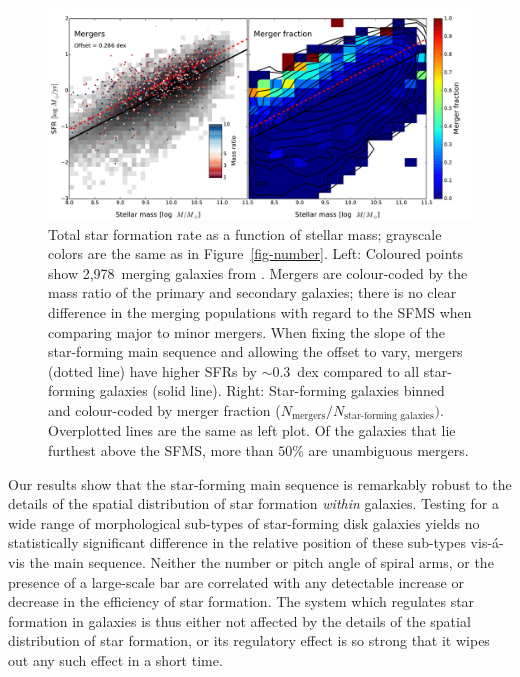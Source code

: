 \documentclass[useAMS,usenatbib]{mn2e}
\begin{document}
\begin{figure}
\includegraphics[angle=0,width=7.0in]{figures/masslim/ms_mergers_both.pdf}
\caption{Total star formation rate as a function of stellar mass; grayscale colors are the same as in Figure~\ref{fig-number}. Left: Coloured points show 2,978~merging galaxies from \citet{dar10a}. Mergers are colour-coded by the mass ratio of the primary and secondary galaxies; there is no clear difference in the merging populations with regard to the SFMS when comparing major to minor mergers. When fixing the slope of the star-forming main sequence and allowing the offset to vary, mergers (dotted line) have higher SFRs by $\sim0.3$~dex compared to all star-forming galaxies (solid line). Right: Star-forming galaxies binned and colour-coded by merger fraction ($N_\textrm{mergers}/N_\textrm{star-forming galaxies})$. Overplotted lines are the same as left plot. Of the galaxies that lie furthest above the SFMS, more than $50\%$ are unambiguous mergers. 
\label{fig-mergers}}
\end{figure}

Our results show that the star-forming main sequence is remarkably robust to the details of the spatial distribution of star formation \textit{within} galaxies. Testing for a wide range of morphological sub-types of star-forming disk galaxies yields no statistically significant difference in the relative position of these sub-types vis-\'a-vis the main sequence. Neither the number or pitch angle of spiral arms, or the presence of a large-scale bar are correlated with any detectable increase or decrease in the efficiency of star formation. The system which regulates star formation in galaxies is thus either not affected by the details of the spatial distribution of star formation, or its regulatory effect is so strong that it wipes out any such effect in a short time. 
\end{document}
